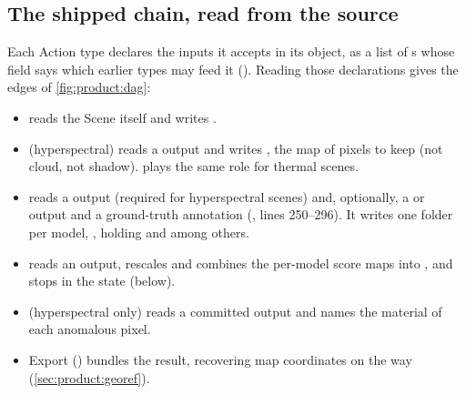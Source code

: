 \subsection{The shipped chain, read from the source}

Each Action type declares the inputs it accepts in its  object, as a list of
s whose  field says which earlier types may
feed it (). Reading those declarations gives the
edges of \cref{fig:product:dag}:
\begin{itemize}
\item {} reads the Scene itself and writes .
\item {} (hyperspectral) reads a  output and
writes , the map of pixels to keep (not cloud, not shadow).
 plays the same role for thermal scenes.
\item {} reads a  output (required for hyperspectral
scenes) and, optionally, a  or  output and a
ground-truth annotation (, lines 250--296). It writes one folder per
model, , holding  and 
among others.
\item {} reads an  output, rescales and combines
the per-model score maps into , and stops in the state
 (below).
\item {} (hyperspectral only) reads a committed
 output and names the material of each anomalous pixel.
\item Export () bundles the result, recovering map coordinates
on the way (\cref{sec:product:georef}).
\end{itemize}

